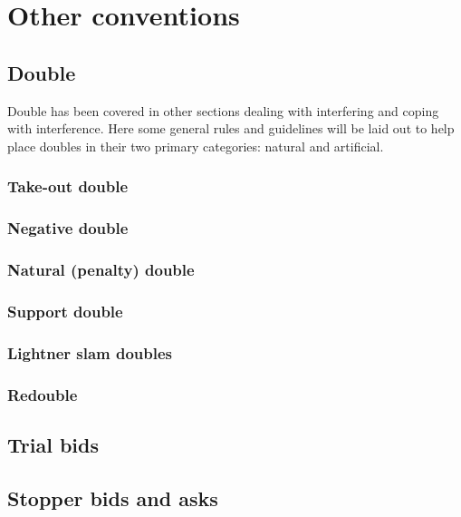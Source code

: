 \chapter{Other conventions}
\label{ch:other_conventions}

\section{Double}

Double has been covered in other sections dealing with interfering and coping with interference.
Here some general rules and guidelines will be laid out to help place doubles in their two primary
categories: natural and artificial.


\subsection{Take-out double}

\subsection{Negative double}

\subsection{Natural (penalty) double}

\subsection{Support double}

\subsection{Lightner slam doubles}

\subsection{Redouble}

\section{Trial bids}

\section{Stopper bids and asks}

